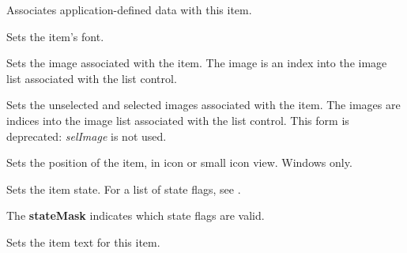 \label{wxlistctrlsetitemdata}


Associates application-defined data with this item.


\label{wxlistctrlsetitemfont}


Sets the item's font.


\label{wxlistctrlsetitemimage}


Sets the image associated with the item. The image is an index into the
image list associated with the list control.


Sets the unselected and selected images associated with the item. The images are indices into the
image list associated with the list control. This form is deprecated: {\it selImage} is not
used.


\label{wxlistctrlsetitemposition}


Sets the position of the item, in icon or small icon view. Windows only.


\label{wxlistctrlsetitemstate}


Sets the item state. For a list of state flags, see .

The {\bf stateMask} indicates which state flags are valid.


\label{wxlistctrlsetitemtext}


Sets the item text for this item.


\label{wxlistctrlsetitemtextcolour}

